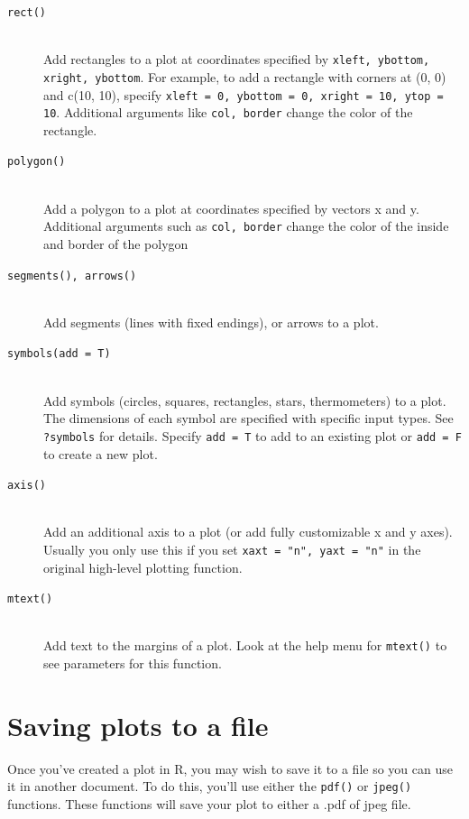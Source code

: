\documentclass{tufte-book}\usepackage[]{graphicx}\usepackage[]{color}
\begin{document}
\begin{footnotesize}
{{\begin{description}
\item[\tt{rect()}] \hfill \\
    Add rectangles to a plot at coordinates specified by \texttt{xleft, ybottom, xright, ybottom}. For example, to add a rectangle with corners at (0, 0) and c(10, 10), specify \texttt{xleft = 0, ybottom = 0, xright = 10, ytop = 10}. Additional arguments like \texttt{col, border} change the color of the rectangle.

\item[\tt{polygon()}] \hfill \\
    Add a polygon to a plot at coordinates specified by vectors x and y. Additional arguments such as \texttt{col, border} change the color of the inside and border of the polygon

\item[\tt{segments(), arrows()}] \hfill \\
 Add segments (lines with fixed endings), or arrows to a plot.
 
\item[\tt{symbols(add = T)}] \hfill \\
Add symbols (circles, squares, rectangles, stars, thermometers) to a plot. The dimensions of each symbol are specified with specific input types. See \texttt{?symbols} for details. Specify \texttt{add = T} to add to an existing plot or \texttt{add = F} to create a new plot.
 
\item[\tt{axis()}] \hfill \\
 Add an additional axis to a plot (or add fully customizable  x and y axes). Usually you only use this if you set \texttt{xaxt = "n", yaxt = "n"} in the original high-level plotting function.
 
\item [\tt{mtext()}] \hfill \\
 Add text to the margins of a plot. Look at the help menu for \texttt{mtext()} to see parameters for this function.
\end{description}

}
}
\vspace{5mm} %




\section{Saving plots to a file}

Once you've created a plot in R, you may wish to save it to a file so you can use it in another document. To do this, you'll use either the \texttt{pdf()} or \texttt{jpeg()} functions. These functions will save your plot to either a .pdf of jpeg file.



\end{footnotesize}
\end{document}

